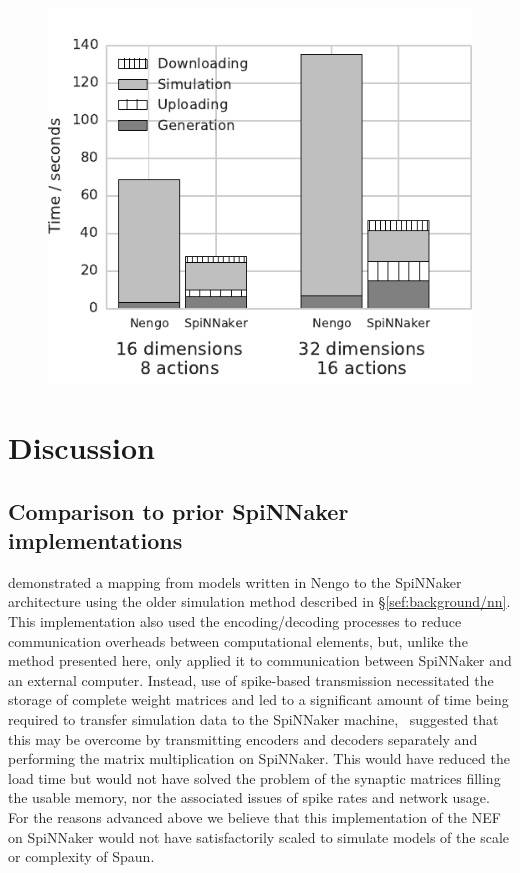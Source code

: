 \documentclass[conference]{IEEEtran}
\begin{document}
  \begin{figure}[!t]
    \includegraphics{figures/spa_wall_clock}
    \caption{}
    \label{fig:results/spa-wall-clock}
  \end{figure}
  \section{Discussion}

  \subsection{Comparison to prior SpiNNaker implementations}

  \textcite{Galluppi2012} demonstrated a mapping from models written in Nengo to the SpiNNaker architecture using the older simulation method described in \S\ref{sef:background/nn}.
  This implementation also used the encoding/decoding processes to reduce communication overheads between computational elements, but, unlike the method presented here, only applied it to communication between SpiNNaker and an external computer.
  Instead, use of spike-based transmission necessitated the storage of complete weight matrices and led to a significant amount of time being required to transfer simulation data to the SpiNNaker machine, \citeauthor{Galluppi2012}\ suggested that this may be overcome by transmitting encoders and decoders separately and performing the matrix multiplication on SpiNNaker.
  This would have reduced the load time but would not have solved the problem of the synaptic matrices filling the usable memory, nor the associated issues of spike rates and network usage.
  For the reasons advanced above we believe that this implementation of the NEF on SpiNNaker would not have satisfactorily scaled to simulate models of the scale or complexity of Spaun.
\end{document}
